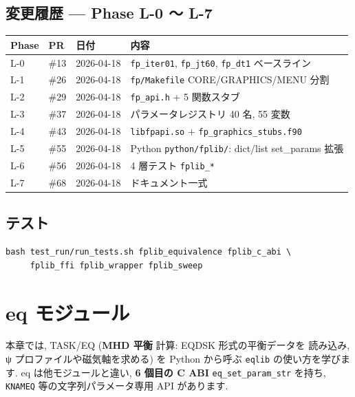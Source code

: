 \documentclass[11pt,a4paper]{report}
\begin{document}
\section{変更履歴 — Phase L-0 〜 L-7}

\begin{center}
\begin{tabular}{@{}lllp{6.5cm}@{}}
\toprule
Phase & PR  & 日付        & 内容 \\ \midrule
L-0   & \#13 & 2026-04-18 & \texttt{fp\_iter01}, \texttt{fp\_jt60}, \texttt{fp\_dt1} ベースライン \\
L-1   & \#26 & 2026-04-18 & \texttt{fp/Makefile} CORE/GRAPHICS/MENU 分割 \\
L-2   & \#29 & 2026-04-18 & \texttt{fp\_api.h} + 5 関数スタブ \\
L-3   & \#37 & 2026-04-18 & パラメータレジストリ 40 名, 55 変数 \\
L-4   & \#43 & 2026-04-18 & \texttt{libfpapi.so} + \texttt{fp\_graphics\_stubs.f90} \\
L-5   & \#55 & 2026-04-18 & Python \texttt{python/fplib/}: dict/list set\_params 拡張 \\
L-6   & \#56 & 2026-04-18 & 4 層テスト \texttt{fplib\_*} \\
L-7   & \#68 & 2026-04-18 & ドキュメント一式 \\
\bottomrule
\end{tabular}
\end{center}

\section{テスト}

\begin{lstlisting}[style=bash]
bash test_run/run_tests.sh fplib_equivalence fplib_c_abi \
     fplib_ffi fplib_wrapper fplib_sweep
\end{lstlisting}

\clearpage
\chapter{eq モジュール}
\label{ch:eq}

\begin{learn}
本章では, TASK/EQ (\textbf{MHD 平衡} 計算: EQDSK 形式の平衡データを
読み込み, ψ プロファイルや磁気軸を求める) を Python から呼ぶ
\texttt{eqlib} の使い方を学びます. eq は他モジュールと違い,
\textbf{6 個目の C ABI} \texttt{eq\_set\_param\_str} を持ち,
\texttt{KNAMEQ} 等の文字列パラメータ専用 API があります.
\end{learn}
\end{document}
